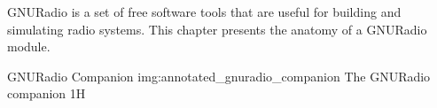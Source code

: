 GNURadio \cite{gnuradioweb} is a set of free software \cite{fsffreeweb}
tools that are useful for building and simulating radio systems.
This chapter presents the anatomy of a GNURadio module.

\begin{subchapter}{GNURadio Companion}
               {img:annotated_gnuradio_companion}
               {The GNURadio companion}
               {1}{H}

\end{subchapter}
